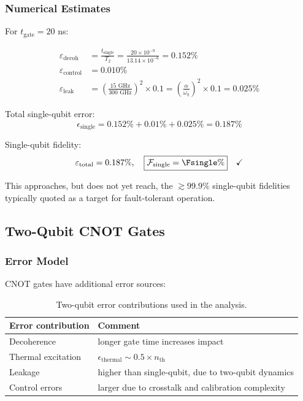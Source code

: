 \subsubsection{Numerical Estimates}

For $t_{\text{gate}} = 20$ ns:

\begin{align}
\varepsilon_{\text{decoh}} &= \frac{t_{\text{single}}}{T_2} = \frac{20 \times 10^{-9}}{13.14 \times 10^{-6}} = 0.152\% \\
\varepsilon_{\text{control}} &= 0.010\% \\
\varepsilon_{\text{leak}} &= \left(\frac{15 \text{ GHz}}{300 \text{ GHz}}\right)^2 \times 0.1 = \left(\frac{\alpha}{\omega_q}\right)^2 \times 0.1 = 0.025\%
\end{align}

Total single-qubit error:
\begin{equation}
\epsilon_{\text{single}} = 0.152\% + 0.01\% + 0.025\% = 0.187\%
\end{equation}

Single-qubit fidelity:
\begin{equation}
\varepsilon_{\text{total}} = 0.187\%, \quad \boxed{\mathcal{F}_{\text{single}} = \Fsingle\%} \quad \checkmark
\end{equation}

This approaches, but does not yet reach, the $\gtrsim 99.9\%$ single-qubit fidelities typically quoted as a target for fault-tolerant operation.

\subsection{Two-Qubit CNOT Gates}

\subsubsection{Error Model}

CNOT gates have additional error sources:
\begin{table}[h]
\centering
\begin{tabular}{@{}lp{}@{}}
\toprule
\textbf{Error contribution} & \textbf{Comment} \\
\midrule
Decoherence          & longer gate time increases impact \\
Thermal excitation   & $\epsilon_{\text{thermal}} \sim 0.5 \times n_{\text{th}}$ \\
Leakage              & higher than single-qubit, due to two-qubit dynamics \\
Control errors       & larger due to crosstalk and calibration complexity \\
\bottomrule
\end{tabular}
\caption{Two-qubit error contributions used in the analysis.}
\label{tab:two_qubit_error_model}
\end{table}

